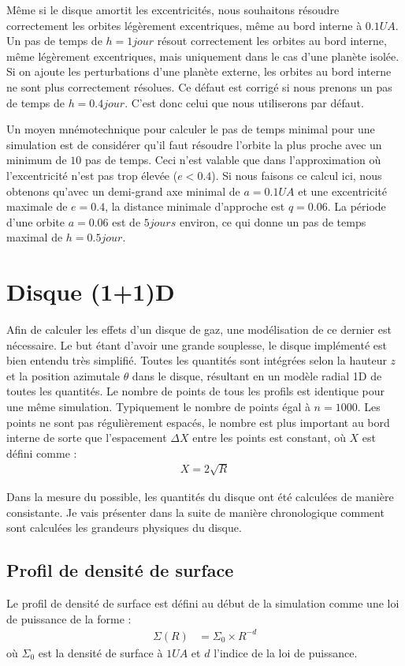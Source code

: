 Même si le disque amortit les excentricités, nous souhaitons résoudre correctement les orbites légèrement excentriques, même au bord interne à $0.1\unit{UA}$. Un pas de temps de $h=1\unit{jour}$ résout correctement les orbites au bord interne, même légèrement excentriques, mais uniquement dans le cas d'une planète isolée. Si on ajoute les perturbations d'une planète externe, les orbites au bord interne ne sont plus correctement résolues. Ce défaut est corrigé si nous prenons un pas de temps de $h=0.4\unit{jour}$. C'est donc celui que nous utiliserons par défaut.

Un moyen mnémotechnique pour calculer le pas de temps minimal pour une simulation est de considérer qu'il faut résoudre l'orbite la plus proche avec un minimum de $10$ pas de temps. Ceci n'est valable que dans l'approximation où l'excentricité n'est pas trop élevée ($e<0.4$). Si nous faisons ce calcul ici, nous obtenons qu'avec un demi-grand axe minimal de $a=0.1\unit{UA}$ et une excentricité maximale de $e=0.4$, la distance minimale d'approche est $q=0.06$. La période d'une orbite $a=0.06$ est de $5\unit{jours}$ environ, ce qui donne un pas de temps maximal de $h=0.5\unit{jour}$. 

\section{Disque (1+1)D}
Afin de calculer les effets d'un disque de gaz, une modélisation de ce dernier est nécessaire. Le but étant d'avoir une grande
souplesse, le disque implémenté est bien entendu très simplifié. Toutes les quantités sont intégrées selon la hauteur $z$ et la
position azimutale $\theta$ dans le disque, résultant en un modèle radial 1D de toutes les quantités. Le nombre de points de
tous les profils est identique pour une même simulation. Typiquement le nombre de points égal à $n=1000$. Les points ne sont
pas régulièrement espacés, le nombre est plus important au bord interne de sorte que l'espacement $\Delta X$ entre les points
est constant, où $X$ est défini comme : 
\begin{align}
X = 2\sqrt{R}
\end{align}

Dans la mesure du possible, les quantités du disque ont été calculées de manière consistante. Je vais présenter dans la suite de manière chronologique comment sont calculées les grandeurs physiques du disque.

\subsection{Profil de densité de surface}
Le profil de densité de surface est défini au début de la simulation comme une loi de puissance de la forme :
\begin{align}
\Sigma(R) &= \Sigma_0 \times R^{-d}
\end{align}
où $\Sigma_0$ est la densité de surface à $1\unit{UA}$ et $d$ l'indice de la loi de puissance. 

